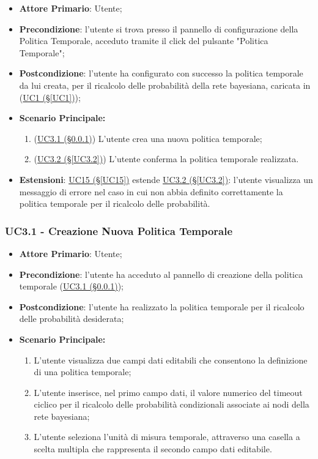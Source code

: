 \begin{itemize}
	\item \textbf{Attore Primario}: Utente; 
	\item \textbf{Precondizione}: l'utente si trova presso il pannello di configurazione della Politica Temporale, acceduto tramite il click del pulsante "Politica Temporale";
	\item \textbf{Postcondizione}: l'utente ha configurato con successo la politica temporale da lui creata, per il ricalcolo delle probabilità della rete bayesiana, caricata in (\hyperref[UC1]{UC1 (§\ref*{UC1})});	
	\item \textbf{Scenario Principale:}
	\begin{enumerate}
		\item (\hyperref[UC3.1]{UC3.1 (§\ref*{UC3.1})}) L'utente crea una nuova politica temporale; 
		\item (\hyperref[UC3.2]{UC3.2 (§\ref*{UC3.2})}) L'utente conferma la politica temporale realizzata.
	\end{enumerate}
	\item \textbf{Estensioni}: \hyperref[UC15]{UC15 (§\ref*{UC15})} estende \hyperref[UC3.2]{UC3.2 (§\ref*{UC3.2})}: l'utente visualizza un messaggio di errore nel caso in cui non abbia definito correttamente la politica temporale per il ricalcolo delle probabilità.
\end{itemize}

\pagebreak

\subsubsection{UC3.1 - Creazione Nuova Politica Temporale}\label{UC3.1}

\begin{itemize}
	\item \textbf{Attore Primario}: Utente; 
	\item \textbf{Precondizione}: l'utente ha acceduto al pannello di creazione della politica temporale (\hyperref[UC3.1]{UC3.1 (§\ref*{UC3.1})});
	\item \textbf{Postcondizione}: l'utente ha realizzato la politica temporale per il ricalcolo delle probabilità desiderata;
	\item \textbf{Scenario Principale:}
	\begin{enumerate}
		\item L'utente visualizza due campi dati editabili che consentono la definizione di una politica temporale;
		\item L'utente inserisce, nel primo campo dati, il valore numerico del timeout ciclico per il ricalcolo delle probabilità condizionali associate ai nodi della rete bayesiana; 
		\item L'utente seleziona l'unità di misura temporale, attraverso una casella a scelta multipla che rappresenta il secondo campo dati editabile.
	\end{enumerate}
	
\end{itemize}


